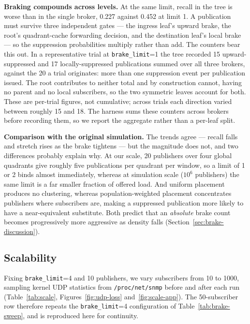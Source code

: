 \documentclass[10pt]{article}
\begin{document}
\textbf{Braking compounds across levels.} At the same limit, recall in the tree is worse than in the single broker, 0.227 against 0.452 at limit 1. A publication must survive three independent gates --- the ingress leaf's upward brake, the root's quadrant-cache forwarding decision, and the destination leaf's local brake --- so the suppression probabilities multiply rather than add. The counters bear this out. In a representative trial at \texttt{brake\_limit}=1 the tree recorded 15 upward-suppressed and 17 locally-suppressed publications summed over all three brokers, against the 20 a trial originates: more than one suppression event per publication issued. The root contributes to neither total and by construction cannot, having no parent and no local subscribers, so the two symmetric leaves account for both. These are per-trial figures, not cumulative; across trials each direction varied between roughly 15 and 18. The harness sums these counters across brokers before recording them, so we report the aggregate rather than a per-leaf split.

\textbf{Comparison with the original simulation.} The trends agree --- recall falls and stretch rises as the brake tightens --- but the magnitude does not, and two differences probably explain why. At our scale, 20 publishers over four global quadrants give roughly five publications per quadrant per window, so a limit of 1 or 2 binds almost immediately, whereas at simulation scale ($10^6$ publishers) the same limit is a far smaller fraction of offered load. And uniform placement produces no clustering, whereas population-weighted placement concentrates publishers where subscribers are, making a suppressed publication more likely to have a near-equivalent substitute. Both predict that an \emph{absolute} brake count becomes progressively more aggressive as density falls (Section~\ref{sec:brake-discussion}).

\subsection{Scalability}
\label{sec:scale}

Fixing \texttt{brake\_limit}=4 and 10 publishers, we vary subscribers from 10 to 1000, sampling kernel UDP statistics from \texttt{/proc/net/snmp} before and after each run (Table~\ref{tab:scale}, Figures~\ref{fig:udp-loss} and~\ref{fig:scale-app}). The 50-subscriber row therefore repeats the \texttt{brake\_limit}=4 configuration of Table~\ref{tab:brake-sweep}, and is reproduced here for continuity.
\end{document}
